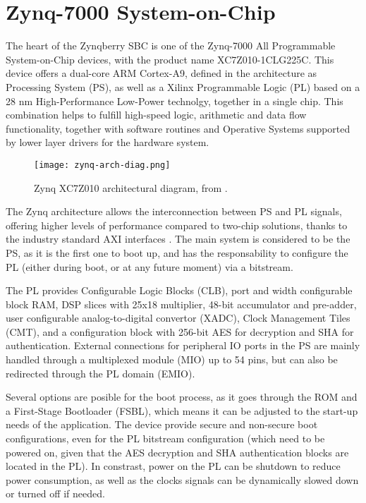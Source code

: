 \section{Zynq-7000 System-on-Chip}\label{zynq7-soc}

The heart of the Zynqberry SBC is one of the Zynq-7000 All Programmable System-on-Chip devices, with the product name XC7Z010-1CLG225C. This device offers a dual-core ARM Cortex-A9, defined in the architecture as Processing System (PS), as well as a Xilinx Programmable Logic (PL) based on a 28 nm High-Performance Low-Power technolgy, together in a single chip. This combination helps to fulfill high-speed logic, arithmetic and data flow functionality, together with software routines and Operative Systems supported by lower layer drivers for the hardware system.

\begin{figure}[htp]
	\centering
	\texttt{[image: zynq-arch-diag.png]}
	\caption{Zynq XC7Z010 architectural diagram, from \cite{DS190}.} \label{fig:zynq-arch-diag}
\end{figure}

The Zynq architecture allows the interconnection between PS  and PL signals, offering higher levels of performance compared to two-chip solutions, thanks to the industry standard AXI interfaces \cite{Crokett2014}. The main system is considered to be the PS, as it is the first one to boot up, and has the responsability to configure the PL (either during boot, or at any future moment) via a bitstream.

The PL provides Configurable Logic Blocks (CLB), port and width configurable block RAM, DSP slices with 25x18 multiplier, 48-bit accumulator and pre-adder, user configurable analog-to-digital convertor (XADC), Clock Management Tiles (CMT), and a configuration block with 256-bit AES for decryption and SHA for authentication. External connections for peripheral IO ports in the PS are mainly handled through a multiplexed module (MIO) up to 54 pins, but can also be redirected through the PL domain (EMIO).

Several options are posible for the boot process, as it goes through the ROM and a First-Stage Bootloader (FSBL), which means it can be adjusted to the start-up needs of the application. The device provide secure and non-secure boot configurations, even for the PL bitstream configuration (which need to be powered on, given that the AES decryption and SHA authentication blocks are located in the PL). In constrast, power on the PL can be shutdown to reduce power consumption, as well as the clocks signals can be dynamically slowed down or turned off if needed.

